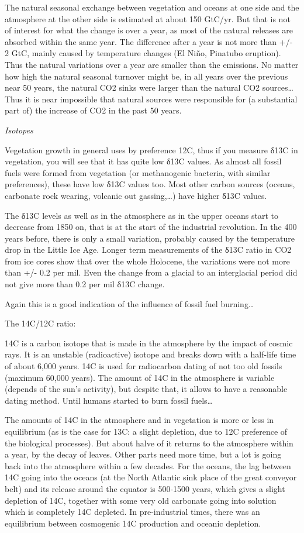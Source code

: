 \documentclass[
]{book}
\begin{document}
The natural seasonal exchange between vegetation and oceans at one side and the atmosphere at the other side is estimated at about 150 GtC/yr. But that is not of interest for what the change is over a year, as most of the natural releases are absorbed within the same year. The difference after a year is not more than +/- 2 GtC, mainly caused by temperature changes (El Niño, Pinatubo eruption). Thus the natural variations over a year are smaller than the emissions. No matter how high the natural seasonal turnover might be, in all years over the previous near 50 years, the natural CO2 sinks were larger than the natural CO2 sources\ldots{} Thus it is near impossible that natural sources were responsible for (a substantial part of) the increase of CO2 in the past 50 years.

\emph{Isotopes}

Vegetation growth in general uses by preference 12C, thus if you measure δ13C in vegetation, you will see that it has quite low δ13C values. As almost all fossil fuels were formed from vegetation (or methanogenic bacteria, with similar preferences), these have low δ13C values too. Most other carbon sources (oceans, carbonate rock wearing, volcanic out gassing,\ldots) have higher δ13C values.

The δ13C levels as well as in the atmosphere as in the upper oceans start to decrease from 1850 on, that is at the start of the industrial revolution. In the 400 years before, there is only a small variation, probably caused by the temperature drop in the Little Ice Age. Longer term measurements of the δ13C ratio in CO2 from ice cores show that over the whole Holocene, the variations were not more than +/- 0.2 per mil. Even the change from a glacial to an interglacial period did not give more than 0.2 per mil δ13C change.

Again this is a good indication of the influence of fossil fuel burning\ldots{}

The 14C/12C ratio:

14C is a carbon isotope that is made in the atmosphere by the impact of cosmic rays. It is an unstable (radioactive) isotope and breaks down with a half-life time of about 6,000 years. 14C is used for radiocarbon dating of not too old fossils (maximum 60,000 years). The amount of 14C in the atmosphere is variable (depends of the sun's activity), but despite that, it allows to have a reasonable dating method. Until humans started to burn fossil fuels\ldots{}

The amounts of 14C in the atmosphere and in vegetation is more or less in equilibrium (as is the case for 13C: a slight depletion, due to 12C preference of the biological processes). But about halve of it returns to the atmosphere within a year, by the decay of leaves. Other parts need more time, but a lot is going back into the atmosphere within a few decades. For the oceans, the lag between 14C going into the oceans (at the North Atlantic sink place of the great conveyor belt) and its release around the equator is 500-1500 years, which gives a slight depletion of 14C, together with some very old carbonate going into solution which is completely 14C depleted. In pre-industrial times, there was an equilibrium between cosmogenic 14C production and oceanic depletion.
\end{document}
